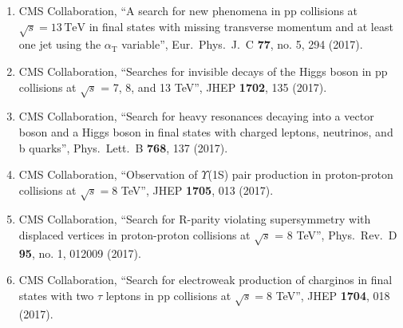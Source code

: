 \begin{itemize}
\begin{enumerate}
\item CMS Collaboration, ``A search for new phenomena in pp collisions at $\sqrt{s} = 13\,\text {TeV} $ in final states with missing transverse momentum and at least one jet using the $\alpha _{\mathrm {T}}$ variable'', Eur.\ Phys.\ J.\ C {\bf 77}, no. 5, 294 (2017).

\item CMS Collaboration, ``Searches for invisible decays of the Higgs boson in pp collisions at $\sqrt{s}$ = 7, 8, and 13 TeV'', JHEP {\bf 1702}, 135 (2017).

\item CMS Collaboration, ``Search for heavy resonances decaying into a vector boson and a Higgs boson in final states with charged leptons, neutrinos, and b quarks'', Phys.\ Lett.\ B {\bf 768}, 137 (2017).

\item CMS Collaboration, ``Observation of $\Upsilon$(1S) pair production in proton-proton collisions at $ \sqrt{s}=8 $ TeV'', JHEP {\bf 1705}, 013 (2017).

\item CMS Collaboration, ``Search for R-parity violating supersymmetry with displaced vertices in proton-proton collisions at $\sqrt{s}$ = 8 TeV'', Phys.\ Rev.\ D {\bf 95}, no. 1, 012009 (2017).

\item CMS Collaboration, ``Search for electroweak production of charginos in final states with two $\tau$ leptons in pp collisions at $ \sqrt{s}=8 $ TeV'', JHEP {\bf 1704}, 018 (2017).


\end{enumerate}
\end{itemize}
